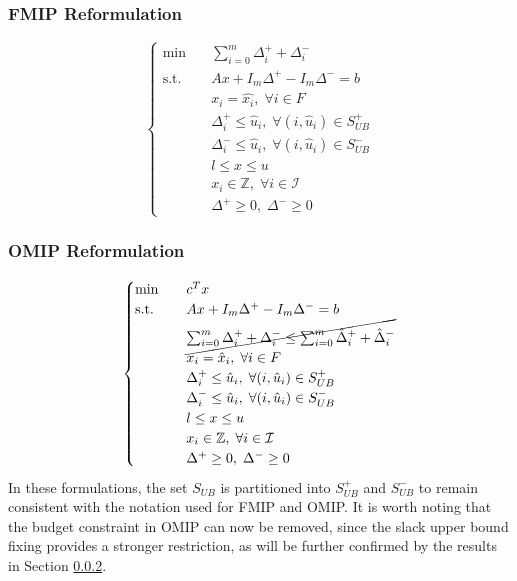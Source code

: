 \subsubsection{FMIP Reformulation}
\begin{equation}
\begin{cases}
\text{min} \quad & \sum_{i=0}^m \Delta_i^{+}+\Delta_i^{-} \\ 
\text{s.t.} \quad & Ax + I_m\Delta^+ - I_m\Delta^- = b\\ 
& x_i = \hat{x_i}, \; \forall i \in F\\ 
& \Delta^+_i \le \hat{u}_i, \; \forall (i,\hat{u}_i) \in S_{UB}^+\\
& \Delta^-_i \le \hat{u}_i, \; \forall (i,\hat{u}_i) \in S_{UB}^-\\  
& l \le x \le u\\ 
& x_i \in \mathbb{Z}, \; \forall i \in \mathcal{I} \\ 
& \Delta^+ \ge 0, \; \Delta^- \ge 0
\end{cases}
\end{equation}

\subsubsection{OMIP Reformulation}
\begin{equation}
\begin{cases}
\text{min} \quad & c^T x \\ 
\text{s.t.} \quad & Ax + I_m\Delta^+ - I_m\Delta^- = b\\
& \cancel{\sum_{i=0}^m \Delta_i^{+}+\Delta_i^{-} \le \sum_{i=0}^m \hat\Delta_i^{+}+\hat\Delta_i^{-}}\\ 
& x_i = \hat{x}_i, \; \forall i \in F\\ 
& \Delta^+_i \le \hat{u}_i, \; \forall (i,\hat{u}_i) \in S_{UB}^+\\
& \Delta^-_i \le \hat{u}_i, \; \forall (i,\hat{u}_i) \in S_{UB}^-\\  
& l \le x \le u\\ 
& x_i \in \mathbb{Z}, \; \forall i \in \mathcal{I} \\ 
& \Delta^+ \ge 0, \; \Delta^- \ge 0 
\end{cases}
\end{equation}
In these formulations, the set $S_{UB}$ is partitioned into $S_{UB}^+$ and $S_{UB}^-$ to remain consistent with the notation used for FMIP and OMIP.  
It is worth noting that the budget constraint in OMIP can now be removed, since the slack upper bound fixing provides a stronger restriction, as will be further confirmed by the results in Section \ref{}.  

